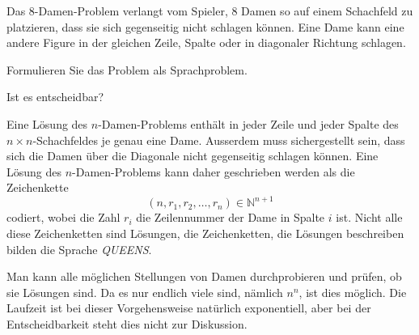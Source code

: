 Das 8-Damen-Problem verlangt vom Spieler, 8 Damen so auf einem Schachfeld
zu platzieren, dass sie sich gegenseitig nicht schlagen können.
Eine Dame kann eine andere Figure in der gleichen Zeile, Spalte oder
in diagonaler Richtung schlagen.
\begin{teilaufgaben}
\item
Formulieren Sie das Problem als Sprachproblem.
\item
Ist es entscheidbar?
\end{teilaufgaben}

\begin{loesung}
\begin{teilaufgaben}
\item
Eine Lösung des $n$-Damen-Problems enthält in jeder Zeile und
jeder Spalte des $n\times n$-Schachfeldes je genau eine Dame.
Ausserdem muss sichergestellt sein, dass sich die Damen über
die Diagonale nicht gegenseitig schlagen können.
Eine Lösung des $n$-Damen-Problems kann daher geschrieben werden
als die Zeichenkette
\[
(n,r_1,r_2,\dots,r_n) \in \mathbb{N}^{n+1}
\]
codiert, wobei die Zahl $r_i$ die Zeilennummer der Dame in Spalte $i$
ist.
Nicht alle diese Zeichenketten sind Lösungen, die Zeichenketten, die
Lösungen beschreiben bilden die Sprache \textit{QUEENS}.
\item
Man kann alle möglichen Stellungen von Damen durchprobieren und prüfen,
ob sie Lösungen sind.
Da es nur endlich viele sind, nämlich $n^n$, ist dies möglich.
Die Laufzeit ist bei dieser Vorgehensweise natürlich exponentiell, aber
bei der Entscheidbarkeit steht dies nicht zur Diskussion.
\qedhere
\end{teilaufgaben}
\end{loesung}
